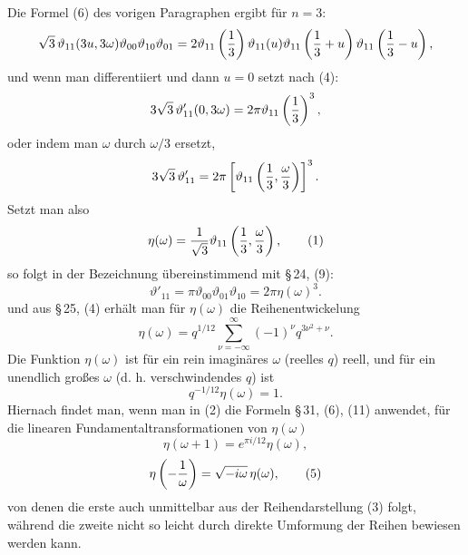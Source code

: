 \documentclass[11pt]{article}
\providecommand{\tht}{\vartheta}
\begin{document}
Die Formel (6) des vorigen Paragraphen ergibt für $n=3$:
\[
\sqrt3\,\tht_{11}(3u,3\omega)\tht_{00}\tht_{10}\tht_{01}
=2\tht_{11}\left({1\over3}\right)\tht_{11}(u)\tht_{11}\left({1\over3}+u\right)\tht_{11}\left({1\over3}-u\right),
\]
und wenn man differentiiert und dann $u=0$ setzt nach (4):
\[
3\sqrt3\,\tht'_{11}(0,3\omega)=2\pi\tht_{11}\left({1\over3}\right)^3,
\]
oder indem man $\omega$ durch $\omega/3$ ersetzt,
\[
3\sqrt3\,\tht'_{11}=2\pi\left[\tht_{11}\left({1\over3},{\omega\over3}\right)\right]^3.
\]
Setzt man also
\begin{equation}
\eta(\omega)={1\over\sqrt3}\tht_{11}\left({1\over3},{\omega\over3}\right), \tag{1}
\end{equation}
so folgt in der Bezeichnung übereinstimmend mit \S\,24, (9):
\begin{equation}
\tht'_{11}=\pi\tht_{00}\tht_{01}\tht_{10}=2\pi\eta(\omega)^3. \tag{2}
\end{equation}
und aus \S\,25, (4) erhält man für $\eta(\omega)$ die Reihenentwickelung
\begin{equation}
\eta(\omega)=q^{1/12}\sum_{\nu=-\infty}^{\infty}(-1)^\nu q^{3\nu^2+\nu}. \tag{3}
\end{equation}
Die Funktion $\eta(\omega)$ ist für ein rein imaginäres $\omega$ (reelles $q$) reell, und für ein unendlich großes $\omega$ (d. h. verschwindendes $q$) ist
\[
q^{-1/12}\eta(\omega)=1.
\]
Hiernach findet man, wenn man in (2) die Formeln \S\,31, (6), (11) anwendet, für die linearen Fundamentaltransformationen von $\eta(\omega)$
\begin{equation}
\eta(\omega+1)=e^{\pi i/12}\eta(\omega), \tag{4}
\end{equation}
\begin{equation}
\eta\left(-{1\over\omega}\right)=\sqrt{-i\omega}\,\eta(\omega), \tag{5}
\end{equation}
von denen die erste auch unmittelbar aus der Reihendarstellung (3) folgt, während die zweite nicht so leicht durch direkte Umformung der Reihen bewiesen werden kann.
\end{document}
